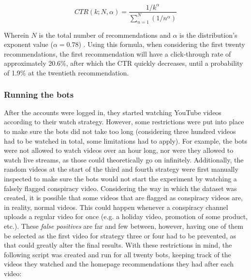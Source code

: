 \documentclass[../main.tex]{subfiles}
\begin{document}
\begin{equation}
CTR(k; N, \alpha) = \frac{1/k^\alpha}{\sum_{n=1}^{N} (1/n^\alpha)}
\end{equation}

Wherein $N$ is the total number of recommendations and $\alpha$ is the distribution's exponent value ($\alpha
= 0.78$) \citep{zhou2010impact}. Using this formula, when considering the first twenty recommendations, the
first recommendation will have a click-through rate of approximately 20.6\%, after which the CTR quickly
decreases, until a probability of 1.9\% at the twentieth recommendation. 

\subsubsection{Running the bots}
After the accounts were logged in, they started watching YouTube videos according to their watch
strategy. However, some restrictions were put into place to make sure the bots did not take too long
(considering three hundred videos had to be watched in total, some limitations had to apply). For
example, the bots were not allowed to watch videos over an hour long, nor were they allowed to watch live
streams, as those could theoretically go on infinitely. Additionally, the random videos at the start of
the third and fourth strategy were first manually inspected to make sure the bots would not start the
experiment by watching a falsely flagged conspiracy video. Considering the way in which the dataset was
created, it is possible that some videos that are flagged as conspiracy videos are, in reality, normal 
videos. This could happen whenever a conspiracy channel uploads a regular video for once (e.g. a holiday 
video, promotion of some product, etc.). These \textit{false positives} are far and few between, however,
having one of them be selected as the first video for strategy three or four had to be prevented, as that
could greatly alter the final results. With these restrictions in mind, the following script was created
and run for all twenty bots, keeping track of the videos they watched and the homepage recommendations they
had after each video:

\vspace{0.25in}

\nolinenumbers
\end{document}
